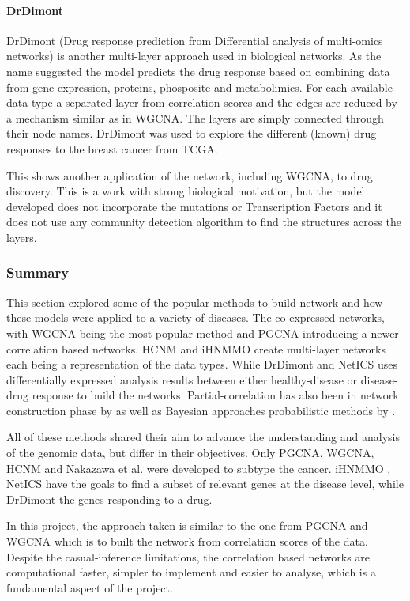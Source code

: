 \paragraph*{DrDimont} \label{s:lit:drDimont}

DrDimont (Drug response prediction from Differential analysis of multi-omics networks) \citet{Hiort2022-lk} is another multi-layer approach used in biological networks. As the name suggested the model predicts the drug response based on combining data from gene expression, proteins, phosposite and metabolimics. For each available data type a separated layer from correlation scores and the edges are reduced by a mechanism similar as in WGCNA. The layers are simply connected through their node names. DrDimont was used to explore the different (known) drug responses to the breast cancer from TCGA.

This shows another application of the network, including WGCNA, to drug discovery. This is a work with strong biological motivation, but the model developed does not incorporate the mutations or Transcription Factors and it does not use any community detection algorithm to find the structures across the layers.

\subsubsection{Summary}


This section explored some of the popular methods to build network and how these models were applied to a variety of diseases. The co-expressed networks, with WGCNA \cite{Langfelder2008-sn} being the most popular method and PGCNA \cite{Care2019-ij} introducing a newer correlation based networks. HCNM \cite{Vangimalla2021-fc} and iHNMMO \citet{Peng2017-ik} create multi-layer networks each being a representation of the data types. While DrDimont \cite{Hiort2022-lk} and NetICS \citet{Dimitrakopoulos2018-br} uses differentially expressed analysis results between either healthy-disease or disease-drug response to build the networks. Partial-correlation has also been in network construction phase by \citet{De_la_Fuente2004-ts} as well as Bayesian approaches  probabilistic methods by \cite{Nakazawa2021-yq, Tamada2011-ok, Tanaka2020-mw}.

All of these methods shared their aim to advance the understanding and analysis of the genomic data, but differ in their objectives. Only PGCNA, WGCNA, HCNM and Nakazawa et al.\cite{Care2019-ij, Langfelder2008-sn, Nakazawa2021-yq,  Vangimalla2021-fc} were developed to subtype the cancer. iHNMMO \cite{Peng2017-ik}, NetICS \cite{Dimitrakopoulos2018-br} have the goals to find a subset of relevant genes at the disease level, while DrDimont \cite{Hiort2022-lk} the genes responding to a drug. 

In this project, the approach taken is similar to the one from PGCNA and WGCNA which is to built the network from correlation scores of the data. Despite the casual-inference limitations, the correlation based networks are computational faster, simpler to implement and easier to analyse, which is a fundamental aspect of the project.